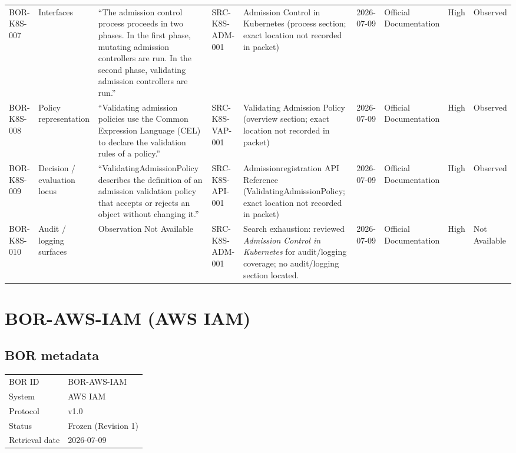 \documentclass[11pt]{article}
\begin{document}
\begin{longtable}{@{}L{1.0in}L{1.1in}L{2.15in}L{1.1in}L{1.25in}L{0.75in}L{0.95in}L{0.75in}L{0.8in}@{}}
BOR-K8S-007 & Interfaces & ``The admission control process proceeds in two phases. In the first phase, mutating admission controllers are run. In the second phase, validating admission controllers are run.'' & SRC-K8S-ADM-001 & Admission Control in Kubernetes (process section; exact location not recorded in packet) & 2026-07-09 & Official Documentation & High & Observed\\
BOR-K8S-008 & Policy representation & ``Validating admission policies use the Common Expression Language (CEL) to declare the validation rules of a policy.'' & SRC-K8S-VAP-001 & Validating Admission Policy (overview section; exact location not recorded in packet) & 2026-07-09 & Official Documentation & High & Observed\\
BOR-K8S-009 & Decision / evaluation locus & ``ValidatingAdmissionPolicy describes the definition of an admission validation policy that accepts or rejects an object without changing it.'' & SRC-K8S-API-001 & Admissionregistration API Reference (ValidatingAdmissionPolicy; exact location not recorded in packet) & 2026-07-09 & Official Documentation & High & Observed\\
BOR-K8S-010 & Audit / logging surfaces & Observation Not Available & SRC-K8S-ADM-001 & Search exhaustion: reviewed \textit{Admission Control in Kubernetes} for audit/logging coverage; no audit/logging section located. & 2026-07-09 & Official Documentation & High & Not Available\\
\bottomrule
\end{longtable}

\section*{BOR-AWS-IAM (AWS IAM)}
\subsection*{BOR metadata}
\begin{tabular}{@{}L{2.2in}L{4.2in}@{}}
\toprule
BOR ID & BOR-AWS-IAM\\
System & AWS IAM\\
Protocol & v1.0\\
Status & Frozen (Revision 1)\\
Retrieval date & 2026-07-09\\
\bottomrule
\end{tabular}
\end{document}

